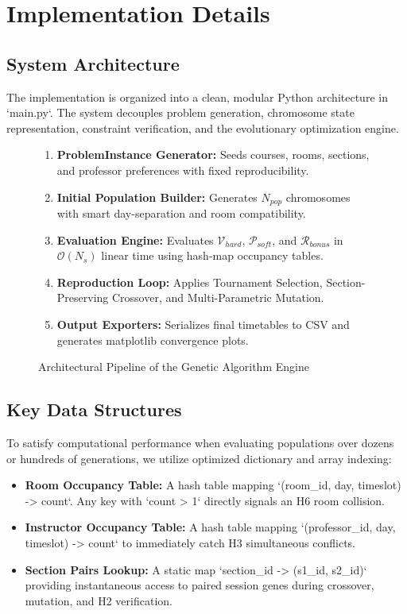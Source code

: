 \documentclass[12pt,a4paper]{report}
\begin{document}
\chapter{Implementation Details}

\section{System Architecture}
The implementation is organized into a clean, modular Python architecture in `main.py`. The system decouples problem generation, chromosome state representation, constraint verification, and the evolutionary optimization engine.

\begin{figure}[H]
  \centering
  \begin{tcolorbox}[colback=PrismWhite, colframe=PrismHeader, width=0.95\linewidth, title=System Flow Architecture]
    \centering
    \small
    \begin{enumerate}[leftmargin=2.0em]
      \item \textbf{ProblemInstance Generator:} Seeds courses, rooms, sections, and professor preferences with fixed reproducibility.
      \item \textbf{Initial Population Builder:} Generates $N_{pop}$ chromosomes with smart day-separation and room compatibility.
      \item \textbf{Evaluation Engine:} Evaluates $\mathcal{V}_{hard}$, $\mathcal{P}_{soft}$, and $\mathcal{R}_{bonus}$ in $\mathcal{O}(N_s)$ linear time using hash-map occupancy tables.
      \item \textbf{Reproduction Loop:} Applies Tournament Selection, Section-Preserving Crossover, and Multi-Parametric Mutation.
      \item \textbf{Output Exporters:} Serializes final timetables to CSV and generates matplotlib convergence plots.
    \end{enumerate}
  \end{tcolorbox}
  \caption{Architectural Pipeline of the Genetic Algorithm Engine}
  \label{fig:pipeline_architecture_prism}
\end{figure}

\section{Key Data Structures}
To satisfy computational performance when evaluating populations over dozens or hundreds of generations, we utilize optimized dictionary and array indexing:
\begin{itemize}[leftmargin=1.5em]
  \item \textbf{Room Occupancy Table:} A hash table mapping `(room_id, day, timeslot) -> count`. Any key with `count > 1` directly signals an H6 room collision.
  \item \textbf{Instructor Occupancy Table:} A hash table mapping `(professor_id, day, timeslot) -> count` to immediately catch H3 simultaneous conflicts.
  \item \textbf{Section Pairs Lookup:} A static map `section_id -> (s1_id, s2_id)` providing instantaneous access to paired session genes during crossover, mutation, and H2 verification.
\end{itemize}
\end{document}
